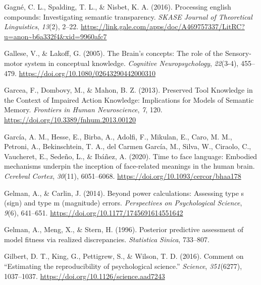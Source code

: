 \documentclass[
  12pt,
  man,floatsintext]{apa7}
\newlength{\cslhangindent}
\newlength{\cslentryspacingunit} %
\newenvironment{CSLReferences}[2] %
 {%
  \setlength{\parindent}{0pt}
  \ifodd #1
  \let\oldpar\par
  \def\par{\hangindent=\cslhangindent\oldpar}
  \fi
  \setlength{\parskip}{#2\cslentryspacingunit}
 }%
 {}
\begin{document}
\begin{CSLReferences}{1}{0}
\leavevmode{}%
Gagné, C. L., Spalding, T. L., \& Nisbet, K. A. (2016). Processing english compounds: {Investigating} semantic transparency. \emph{SKASE Journal of Theoretical Linguistics}, \emph{13}(2), 2--22. \url{https://link.gale.com/apps/doc/A469757337/LitRC?u=anon~b6a332f4\&xid=9960afc7}

\leavevmode{}%
Gallese, V., \& Lakoff, G. (2005). The {Brain}'s concepts: The role of the {Sensory-motor} system in conceptual knowledge. \emph{Cognitive Neuropsychology}, \emph{22}(3-4), 455--479. \url{https://doi.org/10.1080/02643290442000310}

\leavevmode{}%
Garcea, F., Dombovy, M., \& Mahon, B. Z. (2013). Preserved {Tool Knowledge} in the {Context} of {Impaired Action Knowledge}: {Implications} for {Models} of {Semantic Memory}. \emph{Frontiers in Human Neuroscience}, \emph{7}, 120. \url{https://doi.org/10.3389/fnhum.2013.00120}

\leavevmode{}%
García, A. M., Hesse, E., Birba, A., Adolfi, F., Mikulan, E., Caro, M. M., Petroni, A., Bekinschtein, T. A., del Carmen García, M., Silva, W., Ciraolo, C., Vaucheret, E., Sedeño, L., \& Ibáñez, A. (2020). Time to face language: Embodied mechanisms underpin the inception of face-related meanings in the human brain. \emph{Cerebral Cortex}, \emph{30}(11), 6051--6068. \url{https://doi.org/10.1093/cercor/bhaa178}

\leavevmode{}%
Gelman, A., \& Carlin, J. (2014). Beyond power calculations: Assessing type s (sign) and type m (magnitude) errors. \emph{Perspectives on Psychological Science}, \emph{9}(6), 641--651. \url{https://doi.org/10.1177/1745691614551642}

\leavevmode{}%
Gelman, A., Meng, X., \& Stern, H. (1996). Posterior predictive assessment of model fitness via realized discrepancies. \emph{Statistica Sinica}, 733--807.

\leavevmode{}%
Gilbert, D. T., King, G., Pettigrew, S., \& Wilson, T. D. (2016). Comment on {``{Estimating} the reproducibility of psychological science.''} \emph{Science}, \emph{351}(6277), 1037--1037. \url{https://doi.org/10.1126/science.aad7243}


\end{CSLReferences}
\end{document}
